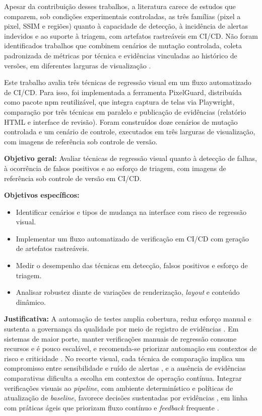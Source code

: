 \documentclass{UNESC}
\begin{document}
Apesar da contribuição desses trabalhos, a literatura carece de estudos que comparem, sob condições experimentais controladas, as três famílias (pixel a pixel, SSIM e regiões) quanto à capacidade de detecção, à incidência de alertas indevidos e ao suporte à triagem, com artefatos rastreáveis em CI/CD. Não foram identificados trabalhos que combinem cenários de mutação controlada, coleta padronizada de métricas por técnica e evidências vinculadas ao histórico de versões, em diferentes larguras de visualização \cite{tanno2020,wang2004,heinonen2020}.

Este trabalho avalia três técnicas de regressão visual em um fluxo automatizado de CI/CD. Para isso, foi implementada a ferramenta PixelGuard, distribuída como pacote npm reutilizável, que integra captura de telas via Playwright, comparação por três técnicas em paralelo e publicação de evidências (relatório HTML e interface de revisão). Foram construídos doze cenários de mutação controlada e um cenário de controle, executados em três larguras de visualização, com imagens de referência sob controle de versão.

\vspace{0.5em}
\noindent
\textbf{Objetivo geral:} Avaliar técnicas de regressão visual quanto à detecção de falhas, à ocorrência de falsos positivos e ao esforço de triagem, com imagens de referência sob controle de versão em CI/CD.

\vspace{0.5em}
\noindent
\textbf{Objetivos específicos:}
\begin{itemize}[leftmargin=2em]
    \item Identificar cenários e tipos de mudança na interface com risco de regressão visual.
    \item Implementar um fluxo automatizado de verificação em CI/CD com geração de artefatos rastreáveis.
    \item Medir o desempenho das técnicas em detecção, falsos positivos e esforço de triagem.
    \item Analisar robustez diante de variações de renderização, \emph{layout} e conteúdo dinâmico.
\end{itemize}

\vspace{0.5em}
\noindent
\textbf{Justificativa:} A automação de testes amplia cobertura, reduz esforço manual e sustenta a governança da qualidade por meio de registro de evidências \cite{alberto2020,banerjee2013}. Em sistemas de maior porte, manter verificações manuais de regressão consome recursos e é pouco escalável, e recomenda-se priorizar automação em contextos de risco e criticidade \cite{costa2022}. No recorte visual, cada técnica de comparação implica um compromisso entre sensibilidade e ruído de alertas \cite{wang2004,tanno2020}, e a ausência de evidências comparativas dificulta a escolha em contextos de operação contínua. Integrar verificações visuais ao \emph{pipeline}, com ambiente determinístico e políticas de atualização de \emph{baseline}, favorece decisões sustentadas por evidências \cite{shahin2017,heinonen2020}, em linha com práticas ágeis que priorizam fluxo contínuo e \emph{feedback} frequente \cite{bessa2018,costa2023}.
\end{document}

